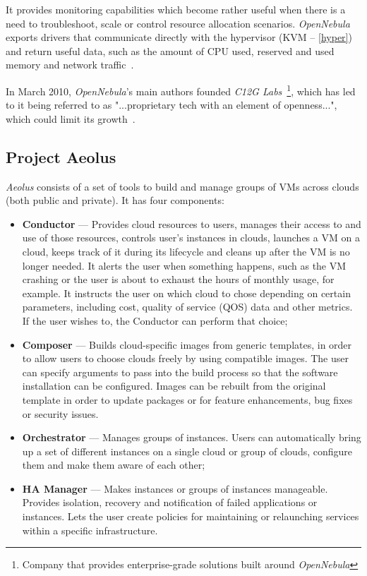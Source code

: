 It provides monitoring capabilities which become rather useful when there is a need to troubleshoot, scale or control resource allocation scenarios. \textit{OpenNebula} exports drivers that communicate directly with the hypervisor (KVM -- \ref{hyper}) and return useful data, such as the amount of CPU used, reserved and used memory and network traffic~\cite{open-clouds}.

In March 2010, \textit{OpenNebula}'s main authors founded \textit{C12G Labs}~\footnote{Company that provides enterprise-grade solutions built around \textit{OpenNebula}}, which has led to it being referred to as "...proprietary tech with an element of openness...", which could limit its growth~\cite{linkedin-opennebula}.

\subsection{Project Aeolus}\label{subsec:aeolus}

\textit{Aeolus} consists of a set of tools to build and manage groups of VMs across clouds (both public and private). It has four components:

\begin{itemize}
\item \textbf{Conductor} --- Provides cloud resources to users, manages their access to and use of those resources, controls user's instances in clouds, launches a VM on a cloud, keeps track of it during its lifecycle and cleans up after the VM is no longer needed. It alerts the user when something happens, such as the VM crashing or the user is about to exhaust the hours of monthly usage, for example. It instructs the user on which cloud to chose depending on certain parameters, including cost, quality of service (QOS) data and other metrics. If the user wishes to, the Conductor can perform that choice;
\item \textbf{Composer} --- Builds cloud-specific images from generic templates, in order to allow users to choose clouds freely by using compatible images. The user can specify arguments to pass into the build process so that the software installation can be configured. Images can be rebuilt from the original template in order to update packages or for feature enhancements, bug fixes or security issues.
\item \textbf{Orchestrator} --- Manages groups of instances. Users can automatically bring up a set of different instances on a single cloud or group of clouds, configure them and make them aware of each other;
\item \textbf{HA Manager} --- Makes instances or groups of instances manageable. Provides isolation, recovery and notification of failed applications or instances. Lets the user create policies for maintaining or relaunching services within a specific infrastructure.
\end{itemize}

